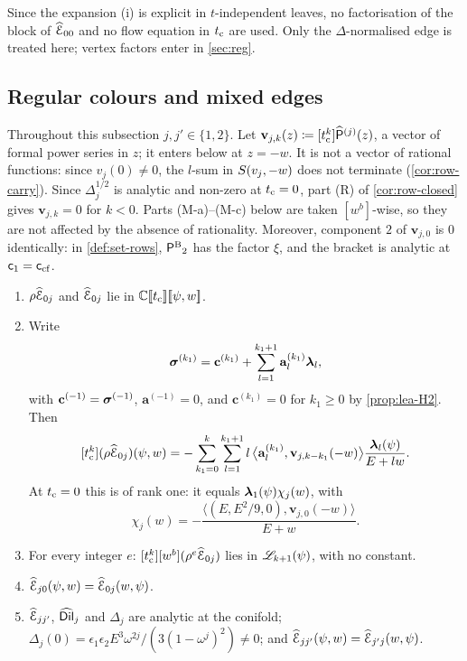 \begin{rmk}
Since the expansion (i) is explicit in $t$-independent leaves, no factorisation of the block of $\widehat{\mathcal{E}}_{00}$ and no flow equation in $t_{\mathrm{c}}$ are used. Only the $\Delta$-normalised edge is treated here; vertex factors enter in \cref{sec:reg}.
\end{rmk}

\subsection{Regular colours and mixed edges}

Throughout this subsection $j,j'\in\{1,2\}$. Let $\mathbf{v}_{j,k}(z)\coloneqq[t_{\mathrm{c}}^k]\widehat{\mathsf{P}}^{(j)}(z)$, a vector of formal power series in $z$; it enters below at $z=-w$. It is not a vector of rational functions: since $v_j(0)\neq0$, the $l$-sum in $S(v_j,-w)$ does not terminate (\cref{cor:row-carry}). Since $\Delta_j^{1/2}$ is analytic and non-zero at $t_{\mathrm{c}}=0$, part (R) of \cref{cor:row-closed} gives $\mathbf{v}_{j,k}=0$ for $k<0$. Parts (M-a)--(M-c) below are taken $[w^b]$-wise, so they are not affected by the absence of rationality. Moreover, component $2$ of $\mathbf{v}_{j,0}$ is $0$ identically: in \cref{def:set-rows}, ${\mathsf{P}^{\mathrm{B}}}_2$ has the factor $\xi$, and the bracket is analytic at $\mathsf{c}_{1}=\mathsf{c}_{\mathrm{cf}}$.

\begin{thm}\label{thm:lea-M}
\leavevmode
\begin{enumerate}
\item[(M-a)] $\rho\widehat{\mathcal{E}}_{0j}$ and $\widehat{\mathcal{E}}_{0j}$ lie in $\mathbb{C}[\![ t_{\mathrm{c}} ]\!][\![ \psi,w ]\!]$.
\item[(M-b)] Write
\[
\boldsymbol{\sigma}^{(k_1)}=\mathbf{c}^{(k_1)}+\sum_{l=1}^{k_1+1}\mathbf{a}_l^{(k_1)}\boldsymbol{\lambda}_l,
\]
with $\mathbf{c}^{(-1)}=\boldsymbol{\sigma}^{(-1)}$, $\mathbf{a}^{(-1)}=0$, and $\mathbf{c}^{(k_1)}=0$ for $k_1\ge0$ by \cref{prop:lea-H2}. Then
\[
[t_{\mathrm{c}}^k](\rho\widehat{\mathcal{E}}_{0j})(\psi,w)=-\sum_{k_1=0}^{k}\sum_{l=1}^{k_1+1}l\,\bigl\langle\mathbf{a}_l^{(k_1)},\mathbf{v}_{j,k-k_1}(-w)\bigr\rangle\frac{\boldsymbol{\lambda}_l(\psi)}{E+lw}.
\]
At $t_{\mathrm{c}}=0$ this is of rank one: it equals $\boldsymbol{\lambda}_1(\psi)\chi_j(w)$, with
\[
\chi_j(w)=-\frac{\bigl\langle(E,E^2/9,0),\mathbf{v}_{j,0}(-w)\bigr\rangle}{E+w}.
\]
\item[(M-c)] For every integer $e$: $[t_{\mathrm{c}}^k][w^b](\rho^e\widehat{\mathcal{E}}_{0j})$ lies in $\mathscr{L}_{k+1}(\psi)$, with no constant.
\item[(M-d)] $\widehat{\mathcal{E}}_{j0}(\psi,w)=\widehat{\mathcal{E}}_{0j}(w,\psi)$.
\item[(M-e)] $\widehat{\mathcal{E}}_{jj'}$, $\widehat{\mathsf{Dil}}_j$ and $\Delta_j$ are analytic at the conifold; $\Delta_j(0)=\epsilon_1\epsilon_2E^3\omega^{2j}/(3(1-\omega^j)^2)\neq0$; and $\widehat{\mathcal{E}}_{jj'}(\psi,w)=\widehat{\mathcal{E}}_{j'j}(w,\psi)$.
\end{enumerate}
\end{thm}

